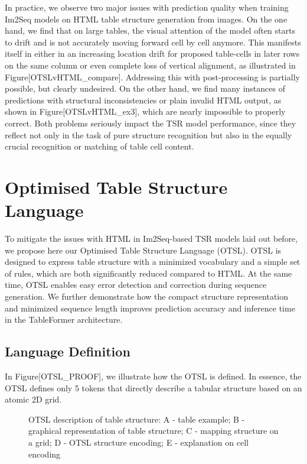 \documentclass[11pt,a4paper]{article}
\begin{document}
In practice, we observe two major issues with prediction quality when training Im2Seq models on HTML table structure generation from images. On the one hand, we find that on large tables, the visual attention of the model often starts to drift and is not accurately moving forward cell by cell anymore. This manifests itself in either in an increasing location drift for proposed table-cells in later rows on the same column or even complete loss of vertical alignment, as illustrated in Figure[OTSLvHTML\_compare]. Addressing this with post-processing is partially possible, but clearly undesired. On the other hand, we find many instances of predictions with structural inconsistencies or plain invalid HTML output, as shown in Figure[OTSLvHTML\_ex3], which are nearly impossible to properly correct. Both problems seriously impact the TSR model performance, since they reflect not only in the task of pure structure recognition but also in the equally crucial recognition or matching of table cell content.

\section{Optimised Table Structure Language}

To mitigate the issues with HTML in Im2Seq-based TSR models laid out before, we propose here our Optimised Table Structure Language (OTSL). OTSL is designed to express table structure with a minimized vocabulary and a simple set of rules, which are both significantly reduced compared to HTML. At the same time, OTSL enables easy error detection and correction during sequence generation. We further demonstrate how the compact structure representation and minimized sequence length improves prediction accuracy and inference time in the TableFormer architecture.

\subsection{Language Definition}

In Figure[OTSL\_PROOF], we illustrate how the OTSL is defined. In essence, the OTSL defines only 5 tokens that directly describe a tabular structure based on an atomic 2D grid.

\begin{figure}[h]
\caption{OTSL description of table structure: A - table example; B - graphical representation of table structure; C - mapping structure on a grid; D - OTSL structure encoding; E - explanation on cell encoding}
\end{figure}
\end{document}
